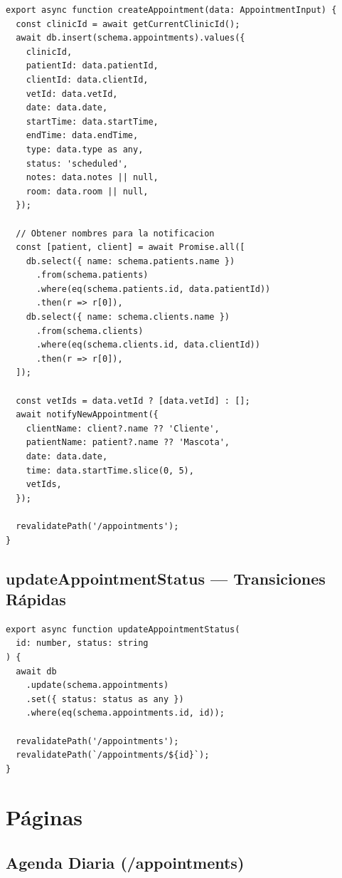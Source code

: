\begin{lstlisting}[style=typescript, caption=createAppointment con notificacion]
export async function createAppointment(data: AppointmentInput) {
  const clinicId = await getCurrentClinicId();
  await db.insert(schema.appointments).values({
    clinicId,
    patientId: data.patientId,
    clientId: data.clientId,
    vetId: data.vetId,
    date: data.date,
    startTime: data.startTime,
    endTime: data.endTime,
    type: data.type as any,
    status: 'scheduled',
    notes: data.notes || null,
    room: data.room || null,
  });

  // Obtener nombres para la notificacion
  const [patient, client] = await Promise.all([
    db.select({ name: schema.patients.name })
      .from(schema.patients)
      .where(eq(schema.patients.id, data.patientId))
      .then(r => r[0]),
    db.select({ name: schema.clients.name })
      .from(schema.clients)
      .where(eq(schema.clients.id, data.clientId))
      .then(r => r[0]),
  ]);

  const vetIds = data.vetId ? [data.vetId] : [];
  await notifyNewAppointment({
    clientName: client?.name ?? 'Cliente',
    patientName: patient?.name ?? 'Mascota',
    date: data.date,
    time: data.startTime.slice(0, 5),
    vetIds,
  });

  revalidatePath('/appointments');
}
\end{lstlisting}

\subsection{updateAppointmentStatus --- Transiciones R\'apidas}

\begin{lstlisting}[style=typescript, caption=updateAppointmentStatus]
export async function updateAppointmentStatus(
  id: number, status: string
) {
  await db
    .update(schema.appointments)
    .set({ status: status as any })
    .where(eq(schema.appointments.id, id));

  revalidatePath('/appointments');
  revalidatePath(`/appointments/${id}`);
}
\end{lstlisting}

\section{P\'aginas}

\subsection{Agenda Diaria (/appointments)}

